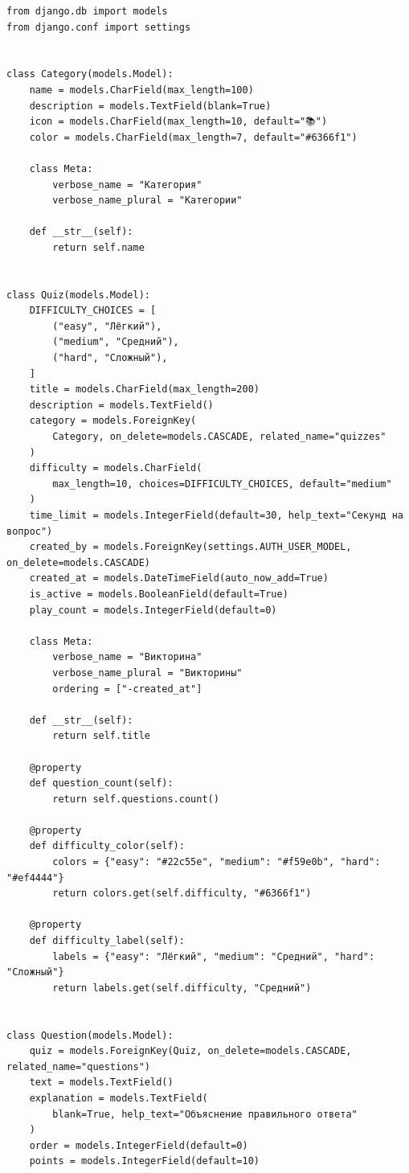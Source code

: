 \documentclass[14pt,a4paper]{extreport}
\begin{document}
\begin{lstlisting}
from django.db import models
from django.conf import settings


class Category(models.Model):
    name = models.CharField(max_length=100)
    description = models.TextField(blank=True)
    icon = models.CharField(max_length=10, default="📚")
    color = models.CharField(max_length=7, default="#6366f1")

    class Meta:
        verbose_name = "Категория"
        verbose_name_plural = "Категории"

    def __str__(self):
        return self.name


class Quiz(models.Model):
    DIFFICULTY_CHOICES = [
        ("easy", "Лёгкий"),
        ("medium", "Средний"),
        ("hard", "Сложный"),
    ]
    title = models.CharField(max_length=200)
    description = models.TextField()
    category = models.ForeignKey(
        Category, on_delete=models.CASCADE, related_name="quizzes"
    )
    difficulty = models.CharField(
        max_length=10, choices=DIFFICULTY_CHOICES, default="medium"
    )
    time_limit = models.IntegerField(default=30, help_text="Секунд на вопрос")
    created_by = models.ForeignKey(settings.AUTH_USER_MODEL, on_delete=models.CASCADE)
    created_at = models.DateTimeField(auto_now_add=True)
    is_active = models.BooleanField(default=True)
    play_count = models.IntegerField(default=0)

    class Meta:
        verbose_name = "Викторина"
        verbose_name_plural = "Викторины"
        ordering = ["-created_at"]

    def __str__(self):
        return self.title

    @property
    def question_count(self):
        return self.questions.count()

    @property
    def difficulty_color(self):
        colors = {"easy": "#22c55e", "medium": "#f59e0b", "hard": "#ef4444"}
        return colors.get(self.difficulty, "#6366f1")

    @property
    def difficulty_label(self):
        labels = {"easy": "Лёгкий", "medium": "Средний", "hard": "Сложный"}
        return labels.get(self.difficulty, "Средний")


class Question(models.Model):
    quiz = models.ForeignKey(Quiz, on_delete=models.CASCADE, related_name="questions")
    text = models.TextField()
    explanation = models.TextField(
        blank=True, help_text="Объяснение правильного ответа"
    )
    order = models.IntegerField(default=0)
    points = models.IntegerField(default=10)


\end{lstlisting}
\end{document}
